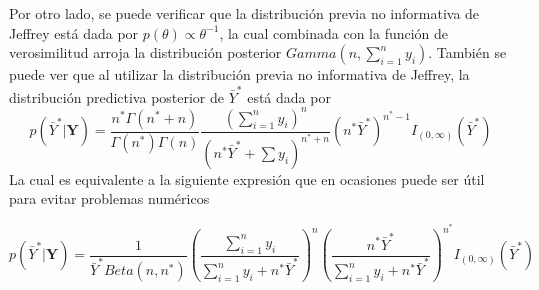 \documentclass[10pt,openright]{book}\usepackage[]{graphicx}\usepackage[]{color}
\begin{document}
    Por otro lado, se puede verificar que la distribuci\'on previa no informativa de Jeffrey est\'a dada por $p(\theta)\propto \theta^{-1}$, la cual combinada con la funci\'on de verosimilitud arroja la distribuci\'on posterior $Gamma(n,\sum_{i=1}^ny_i)$. Tambi\'en se puede ver que al utilizar la distribuci\'on previa no informativa de Jeffrey, la distribuci\'on predictiva posterior de $\bar{Y}^*$ est\'a dada por
    \begin{equation}\label{pred_expo_Jeffreys1}
    p(\bar{Y}^*|\mathbf{Y})=\frac{n^*\Gamma(n^*+n)}{\Gamma(n^*)\Gamma(n)}\frac{(\sum_{i=1}^ny_i)^n}{(n^*\bar{Y}^*+\sum y_i)^{n^*+n}}(n^*\bar{Y}^*)^{n^*-1}I_{(0,\infty)}(\bar{Y}^*)
    \end{equation}
    La cual es equivalente a la siguiente expresi\'on que en ocasiones puede ser \'util para evitar problemas num\'ericos
    
    \begin{equation}\label{pred_expo_Jeffreys2}
    p(\bar{Y}^*|\mathbf{Y})=\frac{1}{\bar{Y}^*Beta(n,n^*)}\left(\frac{\sum_{i=1}^ny_i}{\sum_{i=1}^ny_i+n^*\bar{Y}^*}\right)^n\left(\frac{n^*\bar{Y}^*}{\sum_{i=1}^ny_i+n^*\bar{Y}^*}\right)^{n^*}I_{(0,\infty)}(\bar{Y}^*)
    \end{equation}
    
\end{document}
